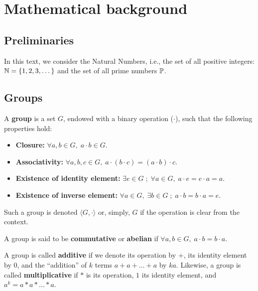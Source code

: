 \documentclass[a4paper,12pt]{article}
\begin{document}
\section{Mathematical background}
\label{mathematical-background}
\subsection{Preliminaries}
\label{sec:org50209c4}
In this text, we  consider the Natural Numbers, i.e.,  the set of all positive integers: \(\N = \{1,2,3,\dots\}\) and the  set of all prime numbers \(\P\).

\subsection{Groups}
\label{sec:org9bd9c80}

\begin{definition}
  A \textbf{group} is a set $G$, endowed with a binary operation ($\cdot$), such
  that the following properties hold:
  \begin{itemize}
  \item \textbf{Closure: } $\forall a,b \in G, \; a\cdot b \in G$.
  \item \textbf{Associativity: } $\forall a,b,c \in G, \; a\cdot(b\cdot c) = (a\cdot b)\cdot c$.
  \item \textbf{Existence of identity element: } $\exists e \in G \; ; \; \forall a \in G, \; a\cdot e = e\cdot a = a$.
  \item \textbf{Existence of inverse element: } $\forall a \in G, \; \exists b \in G \; ; \; a\cdot b = b \cdot a = e$.
  \end{itemize}
Such a group is denoted $\langle G,\cdot\rangle$ or, simply, $G$ if the operation is clear from the context.
\end{definition}

\begin{definition}
  A group is said to be \textbf{commutative} or \textbf{abelian}
  if $\forall a, b \in G, \; a\cdot b = b\cdot a$.
\end{definition}

\begin{text}
  \noindent
  A group is called \textbf{additive} if we denote its operation by $+$, its identity element by $0$, and the ``addition'' of $k$ terms $a+a+\ldots + a$ by $ka$. Likewise, a group is called  \textbf{multiplicative} if $*$ is its operation, $1$ its identity element, and $a^k=a * a * \ldots * a$. 

\end{text}
\end{document}
